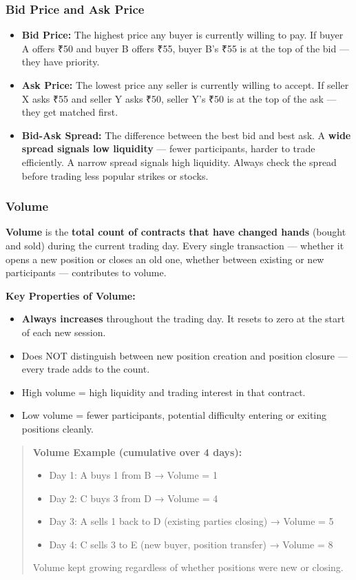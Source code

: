 \documentclass[12pt,openany]{book}
\begin{document}
\subsubsection{Bid Price and Ask Price}

\begin{itemize}[leftmargin=*]
    \item \textbf{Bid Price:} The highest price any buyer is currently willing to pay. If buyer A offers ₹50 and buyer B offers ₹55, buyer B's ₹55 is at the top of the bid — they have priority.
    \item \textbf{Ask Price:} The lowest price any seller is currently willing to accept. If seller X asks ₹55 and seller Y asks ₹50, seller Y's ₹50 is at the top of the ask — they get matched first.
    \item \textbf{Bid-Ask Spread:} The difference between the best bid and best ask. A \textbf{wide spread signals low liquidity} — fewer participants, harder to trade efficiently. A narrow spread signals high liquidity. Always check the spread before trading less popular strikes or stocks.
\end{itemize}

\subsubsection{Volume}

\textbf{Volume} is the \textbf{total count of contracts that have changed hands} (bought and sold) during the current trading day. Every single transaction — whether it opens a new position or closes an old one, whether between existing or new participants — contributes to volume.

\textbf{Key Properties of Volume:}
\begin{itemize}[leftmargin=*]
    \item \textbf{Always increases} throughout the trading day. It resets to zero at the start of each new session.
    \item Does NOT distinguish between new position creation and position closure — every trade adds to the count.
    \item High volume = high liquidity and trading interest in that contract.
    \item Low volume = fewer participants, potential difficulty entering or exiting positions cleanly.
\end{itemize}

\begin{quote}
\textbf{Volume Example (cumulative over 4 days):}
\begin{itemize}[leftmargin=*]
    \item Day 1: A buys 1 from B → Volume = 1
    \item Day 2: C buys 3 from D → Volume = 4
    \item Day 3: A sells 1 back to D (existing parties closing) → Volume = 5
    \item Day 4: C sells 3 to E (new buyer, position transfer) → Volume = 8
\end{itemize}
Volume kept growing regardless of whether positions were new or closing.
\end{quote}
\end{document}
